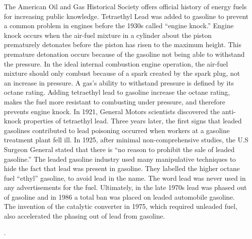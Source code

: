 \documentclass{article}
\begin{document}
The American Oil and Gas Historical Society offers official history of energy fuels for increasing public knowledge. Tetraethyl Lead was added to gasoline to prevent a common problem in engines before the 1930s called “engine knock.” Engine knock occurs when the air-fuel mixture in a cylinder about the piston prematurely detonates before the piston has risen to the maximum height. This premature detonation occurs because of the gasoline not being able to withstand the pressure. In the ideal internal combustion engine operation, the air-fuel mixture should only combust because of a spark created by the spark plug, not an increase in pressure. A gas’s ability to withstand pressure is defined by its octane rating. Adding tetraethyl lead to gasoline increase the octane rating, makes the fuel more resistant to combusting under pressure, and therefore prevents engine knock. In 1921, General Motors scientists discovered the anti-knock properties of tetraethyl lead. Three years later, the first signs that leaded gasolines contributed to lead poisoning occurred when workers at a gasoline treatment plant fell ill. In 1925, after minimal non-comprehensive studies, the U.S Surgeon General stated that there is “no reason to prohibit the sale of leaded gasoline.” The leaded gasoline industry used many manipulative techniques to hide the fact that lead was present in gasoline. They labelled the higher octane fuel “ethyl” gasoline, to avoid lead in the name. The word lead was never used in any advertisements for the fuel. Ultimately, in the late 1970s lead was phased out of gasoline and in 1986 a total ban was placed on leaded automobile gasoline. The invention of the catalytic converter in 1975, which required unleaded fuel, also accelerated the phasing out of lead from gasoline. 

\bigskip


\noindent {} .
\end{document}
